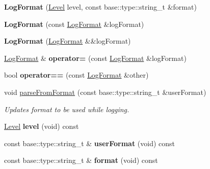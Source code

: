 \begin{DoxyCompactItemize}
\item 
\hypertarget{a00046_a746a49231f1b046803dd2144ae2a2c76}{}{\bfseries Log\+Format} (\hyperlink{a00183_ab0ac6091262344c52dd2d3ad099e8e36}{Level} level, const base\+::type\+::string\+\_\+t \&format)\label{a00046_a746a49231f1b046803dd2144ae2a2c76}

\item 
\hypertarget{a00046_a8cc88ab095024bcfb90dd3ad7208f2ef}{}{\bfseries Log\+Format} (const \hyperlink{a00046}{Log\+Format} \&log\+Format)\label{a00046_a8cc88ab095024bcfb90dd3ad7208f2ef}

\item 
\hypertarget{a00046_a697d52d55c6b6c6b8e6d5ceb37d66c19}{}{\bfseries Log\+Format} (\hyperlink{a00046}{Log\+Format} \&\&log\+Format)\label{a00046_a697d52d55c6b6c6b8e6d5ceb37d66c19}

\item 
\hypertarget{a00046_a3c81e5976c3f3a8cb428eeeb3f188ac2}{}\hyperlink{a00046}{Log\+Format} \& {\bfseries operator=} (const \hyperlink{a00046}{Log\+Format} \&log\+Format)\label{a00046_a3c81e5976c3f3a8cb428eeeb3f188ac2}

\item 
\hypertarget{a00046_a31e85c6f74da6fe36d156a89a6c7fb91}{}bool {\bfseries operator==} (const \hyperlink{a00046}{Log\+Format} \&other)\label{a00046_a31e85c6f74da6fe36d156a89a6c7fb91}

\item 
void \hyperlink{a00046_ab7c1b15cfdad24cfbc6dbced8b9d66eb}{parse\+From\+Format} (const base\+::type\+::string\+\_\+t \&user\+Format)
\begin{DoxyCompactList}\small\item\em Updates format to be used while logging. \end{DoxyCompactList}\item 
\hypertarget{a00046_a6c5d17ad378ccb6e53beb2d48143fecb}{}\hyperlink{a00183_ab0ac6091262344c52dd2d3ad099e8e36}{Level} {\bfseries level} (void) const \label{a00046_a6c5d17ad378ccb6e53beb2d48143fecb}

\item 
\hypertarget{a00046_a9ca6ecd5b9342653493670d5a4e230cd}{}const base\+::type\+::string\+\_\+t \& {\bfseries user\+Format} (void) const \label{a00046_a9ca6ecd5b9342653493670d5a4e230cd}

\item 
\hypertarget{a00046_ac19602b3153daa9a76b56d3f4ff3beaa}{}const base\+::type\+::string\+\_\+t \& {\bfseries format} (void) const \label{a00046_ac19602b3153daa9a76b56d3f4ff3beaa}


\end{DoxyCompactItemize}
